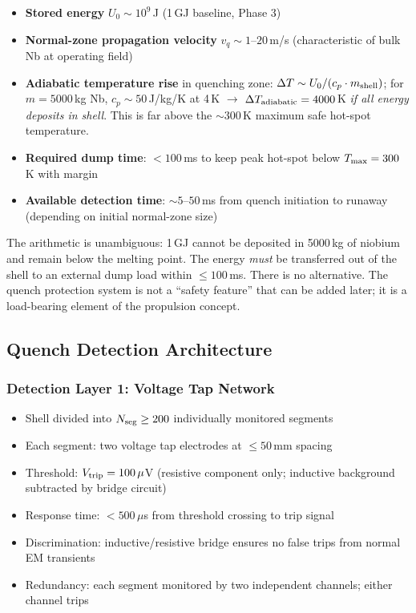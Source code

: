 \documentclass[11pt,a4paper]{article}
\begin{document}
\begin{itemize}
  \item \textbf{Stored energy} $U_0 \sim 10^9$\,J (1\,GJ baseline, Phase 3)
  \item \textbf{Normal-zone propagation velocity} $v_q \sim 1$--$20$\,m/s
    (characteristic of bulk Nb at operating field)
  \item \textbf{Adiabatic temperature rise} in quenching zone:
    $\Delta T \sim U_0 / (c_p \cdot m_{\rm shell})$; for $m = 5000$\,kg
    Nb, $c_p \sim 50$\,J/kg/K at 4\,K $\to$ $\Delta T_{\rm adiabatic}
    = 4000$\,K \textit{if all energy deposits in shell}.
    This is far above the $\sim 300$\,K maximum safe hot-spot temperature.
  \item \textbf{Required dump time}: $< 100$\,ms to keep peak hot-spot
    below $T_{\rm max} = 300$\,K with margin
  \item \textbf{Available detection time}: $\sim 5$--$50$\,ms from
    quench initiation to runaway (depending on initial normal-zone size)
\end{itemize}

\begin{critbox}
The arithmetic is unambiguous: 1\,GJ cannot be deposited in 5000\,kg of
niobium and remain below the melting point. The energy \textit{must} be
transferred out of the shell to an external dump load within $\leq 100$\,ms.
There is no alternative. The quench protection system is not a
``safety feature'' that can be added later; it is a load-bearing
element of the propulsion concept.
\end{critbox}

\subsection{Quench Detection Architecture}

\subsubsection{Detection Layer 1: Voltage Tap Network}

\begin{itemize}
  \item Shell divided into $N_{\rm seg} \geq 200$ individually monitored
    segments
  \item Each segment: two voltage tap electrodes at $\leq 50$\,mm spacing
  \item Threshold: $V_{\rm trip} = 100\,\mu$V (resistive component only;
    inductive background subtracted by bridge circuit)
  \item Response time: $< 500\,\mu$s from threshold crossing to trip signal
  \item Discrimination: inductive/resistive bridge ensures no false trips
    from normal EM transients
  \item Redundancy: each segment monitored by two independent channels;
    either channel trips
\end{itemize}
\end{document}
